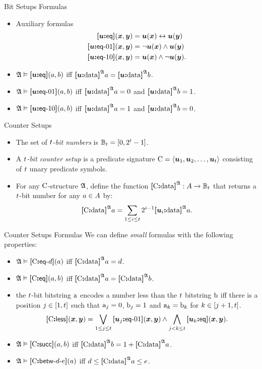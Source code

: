 \documentclass{beamer}
\begin{document}
\begin{frame}{Bit Setups Formulas}
\begin{itemize}
  \item Auxiliary formulas
  \begin{align*}
    \feq\su(\xx,\yy) &= \su(\xx) \lequ \su(\yy) \\
    \feqOI\su(\xx,\yy) &= \lnot \su(\xx) \land \su(\yy) \\
    \feqIO\su(\xx,\yy) &= \su(\xx) \land \lnot \su(\yy). \\
  \end{align*}
  \item $\StrA\vDash\feq\su(\ea,\eb)$ iff $\data\su\StrA\ea = \data\su\StrA\eb$.
  \item $\StrA\vDash\feqOI\su(\ea,\eb)$ iff $\data\su\StrA\ea = 0$ and
  $\data\su\StrA\eb = 1$.
  \item $\StrA\vDash\feqIO\su(\ea,\eb)$ iff $\data\su\StrA\ea = 1$ and
  $\data\su\StrA\eb = 0$.
\end{itemize}
\end{frame}

\begin{frame}{Counter Setups}
\begin{itemize}
  \item The set of \emph{$\tbit$-bit numbers} is $\Bitnumst = [0, 2^\tbit-1]$.
  \item A \emph{$\tbit$-bit counter setup} is a predicate signature $\CS =
  \seq{\suu1,\suu2,\dots,\suu\tbit}$ consisting of $\tbit$ unary predicate
  symbols.
  \item For any $\CS$-structure $\StrA$, define the function $\data\CS\StrA :
  \domA \to \Bitnumst$ that returns a $\tbit$-bit number for any
  $\ea\in\domA$ by:
  \[
    \data\CS\StrA\ea = \sum_{1 \leq \ii \leq \tbit} 2^{\ii-1} 
    \data{\suu\ii}\StrA\ea.
  \]
\end{itemize}
\end{frame}

\begin{frame}{Counter Setups Formulas}
We can define \emph{small} formulas with the following properties:
\begin{itemize}
  \item $\StrA\vDash\feqA\CS\datad(\ea)$ iff $\data\CS\StrA\ea = \datad$.
  \item $\StrA\vDash\feq\CS(\ea,\eb)$ iff $\data\CS\StrA\ea = \data\CS\StrA\eb$.
  \item the $\tbit$-bit bitstring $\bstra$ encodes a number less than the
  $\tbit$ bitstring $\bstrb$ iff there is a position $\jj\in[1,\tbit]$ such that
  $\bstra_j = 0$, $\bstrb_j = 1$ and $\bstra_k = \bstrb_k$ for
  $k\in[j+1,\tbit]$.
  \[
    \fless\CS(\xx,\yy) = \bigvee_{1 \leq \jj \leq \tbit} \feqOI{\suu\jj}(\xx,\yy)
    \land \bigwedge_{\jj < \kk \leq \tbit} \feq{\suu\kk}(\xx,\yy).
  \]
  \item $\StrA\vDash\fsucc\CS(\ea,\eb)$ iff $\data\CS\StrA\eb = 1 +
  \data\CS\StrA\ea$.
  \item
  $\StrA \vDash \fbetw\CS\datad\datae(\ea)$ iff
  $\datad \leq \data\CS\StrA\ea \leq \datae$.
\end{itemize}
\end{frame}
\end{document}
